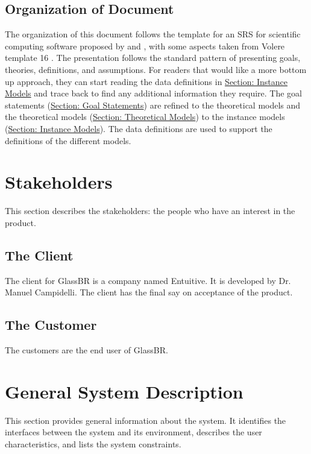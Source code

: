 \documentclass[12pt]{article}
\begin{document}
\subsection{Organization of Document}
\label{Sec:DocOrg}
The organization of this document follows the template for an SRS for scientific computing software proposed by \cite{koothoor2013} and \cite{smithLai2005}, with some aspects taken from Volere template 16 \cite{rbrtsn2012}. The presentation follows the standard pattern of presenting goals, theories, definitions, and assumptions. For readers that would like a more bottom up approach, they can start reading the data definitions in \hyperref[Sec:IMs]{Section: Instance Models} and trace back to find any additional information they require.
The goal statements (\hyperref[Sec:GoalStmt]{Section: Goal Statements}) are refined to the theoretical models and the theoretical models (\hyperref[Sec:TMs]{Section: Theoretical Models}) to the instance models (\hyperref[Sec:IMs]{Section: Instance Models}). The data definitions are used to support the definitions of the different models.
\section{Stakeholders}
\label{Sec:Stakeholder}
This section describes the stakeholders: the people who have an interest in the product.
\subsection{The Client}
\label{Sec:Client}
The client for GlassBR is a company named Entuitive. It is developed by Dr. Manuel Campidelli. The client has the final say on acceptance of the product.
\subsection{The Customer}
\label{Sec:Customer}
The customers are the end user of GlassBR.
\section{General System Description}
\label{Sec:GenSysDesc}
This section provides general information about the system. It identifies the interfaces between the system and its environment, describes the user characteristics, and lists the system constraints.
\end{document}
